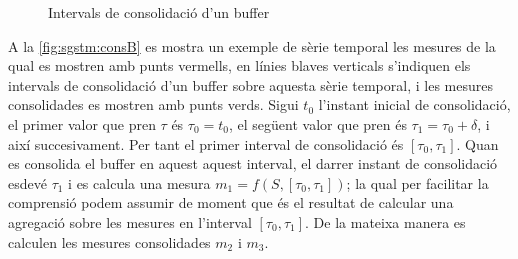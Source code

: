 \begin{figure}[tp]
  \centering

  \caption{Intervals de consolidació d'un buffer}
  \label{fig:sgstm:consB}
\end{figure}




A la \autoref{fig:sgstm:consB} es mostra un exemple de sèrie temporal
les mesures de la qual es mostren amb punts vermells, en línies blaves
verticals s'indiquen els intervals de consolidació d'un buffer sobre
aquesta sèrie temporal, i les mesures consolidades es mostren amb
punts verds.  Sigui $t_0$ l'instant inicial de consolidació, el primer
valor que pren $\tau$ és $\tau_0=t_0$, el següent valor que pren és
$\tau_1=\tau_0+\delta$, i així succesivament. Per tant el primer
interval de consolidació és $[\tau_0,\tau_1]$.  Quan es consolida el
buffer en aquest aquest interval, el darrer instant de consolidació
esdevé $\tau_1$ i es calcula una mesura $m_1=f(S,[\tau_0,\tau_1])$; la
qual per facilitar la comprensió podem assumir de moment que és el
resultat de calcular una agregació sobre les mesures en l'interval
$[\tau_0,\tau_1]$. De la mateixa manera es calculen les mesures
consolidades $m_2$ i $m_3$.




